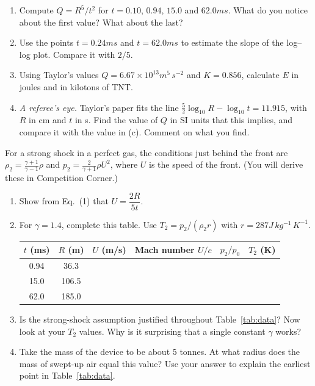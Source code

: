 \documentclass[11pt,a4paper]{article}
\begin{document}
\begin{enumerate}[label=(\alph*)]
  \item Compute $Q=R^5/t^2$ for $t=0.10$, $0.94$, $15.0$ and $62.0\unit{ms}$. What do you notice about the first value? What about the last?
  \item Use the points $t=0.24\unit{ms}$ and $t=62.0\unit{ms}$ to estimate the slope of the log--log plot. Compare it with $2/5$.
  \item Using Taylor's values $Q=6.67\times10^{13}\unit{m^5\,s^{-2}}$ and $K=0.856$, calculate $E$ in joules and in kilotons of TNT.
  \item \textit{A referee's eye.} Taylor's paper fits the line $\tfrac52\log_{10}R-\log_{10}t=11.915$, with $R$ in cm and $t$ in s. Find the value of $Q$ in SI units that this implies, and compare it with the value in (c). Comment on what you find.
\end{enumerate}

For a strong shock in a perfect gas, the conditions just behind the front are $\rho_2=\frac{\gamma+1}{\gamma-1}\rho$ and $p_2=\frac{2}{\gamma+1}\rho U^2$, where $U$ is the speed of the front. (You will derive these in Competition Corner.)
\begin{enumerate}[label=(\alph*)]
  \item Show from Eq.~(1) that $U=\dfrac{2R}{5t}$.
  \item For $\gamma=1.4$, complete this table. Use $T_2=p_2/(\rho_2 r)$ with $r=287\unit{J\,kg^{-1}\,K^{-1}}$.

  \smallskip
  {\small
  \begin{tabular}{cccccc}
  \toprule
  \headrow $t$ (ms) & $R$ (m) & $U$ (m/s) & Mach number $U/c$ & $p_2/p_0$ & $T_2$ (K) \\
  \midrule
  0.94 & 36.3 & & & & \\
  15.0 & 106.5 & & & & \\
  62.0 & 185.0 & & & & \\
  \bottomrule
  \end{tabular}}
  \smallskip
  \item Is the strong-shock assumption justified throughout Table~\ref{tab:data}? Now look at your $T_2$ values. Why is it surprising that a single constant $\gamma$ works?
  \item Take the mass of the device to be about 5 tonnes. At what radius does the mass of swept-up air equal this value? Use your answer to explain the earliest point in Table~\ref{tab:data}.
\end{enumerate}
\end{document}
